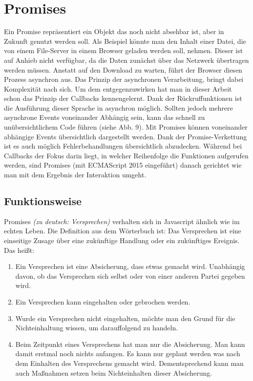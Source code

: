 \section{Promises}

Ein Promise repräsentiert ein Objekt das noch nicht absehbar ist, aber in Zukunft genutzt werden soll. Als Beispiel könnte man den Inhalt einer Datei, die von einem File-Server in einem Browser geladen werden soll, nehmen. Dieser ist auf Anhieb nicht verfügbar, da die Daten zunächst über das Netzwerk übertragen werden müssen. Anstatt auf den Download zu warten, führt der Browser diesen Prozess asynchron aus. Das Prinzip der asynchronen Verarbeitung, bringt dabei Komplexität nach sich. Um dem entgegenzuwirken hat man in dieser Arbeit schon das Prinzip der Callbacks kennengelernt. Dank der Rückruffunktionen ist die Ausführung dieser Sprache in asynchron möglich. Sollten jedoch mehrere asynchrone Events voneinander Abhängig sein, kann das schnell zu unübersichtlichem Code führen (siehe Abb. 9). Mit Promises können voneinander abhängige Events übersichtlich dargestellt werden. Dank der Promise-Verkettung ist es auch möglich Fehlerbehandlungen übersichtlich abzudecken. Während bei Callbacks der Fokus darin liegt, in welcher Reihenfolge die Funktionen aufgerufen werden, sind Promises (mit ECMAScript 2015 eingeführt) danach gerichtet wie man mit dem Ergebnis der Interaktion umgeht.

\subsection{Funktionsweise}

\noindent
Promises \textit{(zu deutsch: Versprechen)} verhalten sich in Javascript ähnlich wie im echten Leben. Die Definition aus dem Wörterbuch ist: Das Versprechen ist eine einseitige Zusage über eine zukünftige Handlung oder ein zukünftiges Ereignis. \cite{versprechen} \\

\noindent
Das heißt:

\begin{enumerate}
    \item Ein Versprechen ist eine Absicherung, dass etwas gemacht wird. Unabhängig davon, ob das Versprechen sich selbst oder von einer anderen Partei gegeben wird.
    
    \item Ein Versprechen kann eingehalten oder gebrochen werden.
    
    \item Wurde ein Versprechen nicht eingehalten, möchte man den Grund für die Nichteinhaltung wissen, um darauffolgend zu handeln.
    
    \item Beim Zeitpunkt eines Versprechens hat man nur die Absicherung. Man kann damit erstmal noch nichts anfangen. Es kann nur geplant werden was nach dem Einhalten des Versprechens gemacht wird. Dementsprechend kann man auch Maßnahmen setzen beim Nichteinhalten dieser Absicherung.
    
\end{enumerate}

